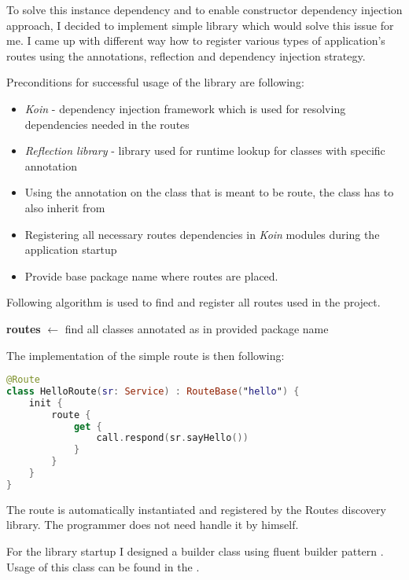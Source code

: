 To solve this  instance dependency and to enable constructor dependency injection approach,
I decided to implement simple library which would solve this issue for me.
I came up with different way how to register various types of application's routes using the annotations, 
reflection and dependency injection strategy.

\medskip \noindent
Preconditions for successful usage of the library are following:
\begin{itemize}
	\item \textit{Koin}\cite{koinGithub} - dependency injection framework which is used for resolving dependencies needed in the routes
	\item \textit{Reflection library}\cite{reflectionsGithub} - library used for runtime lookup for classes with specific annotation
	\item Using the  annotation on the class that is meant to be route,
	the class has to also inherit from 
	\item Registering all necessary routes dependencies in \textit{Koin} modules during the application startup
	\item Provide base package name where routes are placed.
\end{itemize}

\medskip \noindent
Following algorithm is used to find and register all routes used in the project.

\begin{algorithm}[H]
	\SetAlgoLined
	\textbf{routes} $\leftarrow$ find all classes annotated as  in provided package name\;
\end{algorithm} 
\medskip \noindent
The implementation of the simple route is then following:
\medskip
\begin{lstlisting}[language=Kotlin]
@Route
class HelloRoute(sr: Service) : RouteBase("hello") {
    init {
        route {
            get {
                call.respond(sr.sayHello())
            }
        }
    }
}
\end{lstlisting}

\medskip \noindent
The route is automatically instantiated and registered by the Routes discovery library.
The programmer does not need handle it by himself.

For the library startup I designed a builder class using fluent builder pattern .
Usage of this class can be found in the .